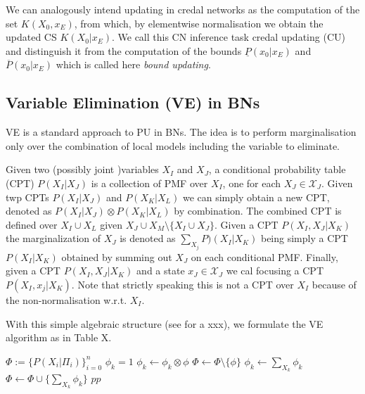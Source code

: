 We can analogously intend updating in credal networks as the computation of the set $K(X_0,x_E)$, from which, by elementwise normalisation we obtain the updated CS $K(X_0|x_E)$. We call this CN inference task credal updating (CU) and distinguish it from the computation of the bounds $\underline{P}(x_0|x_E)$ and $\overline{P}(x_0|x_E)$ which is called here \emph{bound updating}.

\subsection{Variable Elimination (VE) in BNs}

VE is a standard approach to PU in BNs. The idea is to perform marginalisation only over the combination of local models including the variable to eliminate.

Given two (possibly joint )variables $X_I$ and $X_J$, a conditional probability table (CPT) $P(X_I|X_J)$ is a collection of PMF over $X_I$, one for each $X_J\in\mathcal{X}_J$. Given twp CPTs $P(X_I|X_J)$ and $P(X_K|X_L)$ we can simply obtain a new CPT, denoted as $P(X_I|X_J)\otimes P(X_K|X_L)$ by combination. The combined CPT is defined over $X_I \cup X_L$ given $X_J \cup X_M \setminus \{ X_I \cup X_J\}$. Given a CPT $P(X_I,X_J|X_K)$
the marginalization of $X_J$ is denoted as $\sum_{X_j} P)(X_I|X_K)$ being simply a CPT $P(X_I|X_K)$ obtained by summing out $X_J$ on each conditional PMF. Finally, given a CPT $P(X_I,X_J|X_K)$ and a state $x_J\in\mathcal{X}_J$ we cal focusing a CPT $P(X_I,x_j|X_K)$. Note that strictly speaking this is not a CPT over $X_I$ because of the non-normalisation w.r.t. $X_I$.

With this simple algebraic structure (see \cite{kohlas2003} for a xxx), we formulate the VE algorithm as in Table X.


\begin{algorithm}
	\caption{VE algorithm
		\vskip 0.6mm [INPUT] a BN specification, an evidence $(x_{n-n_e},\ldots,x_n)$%
		\vskip 0.6mm [OUTPUT] $K(X_o|x_{n-n_e},\ldots,x_n)$} %
	\begin{algorithmic}[1]
		\State $\Phi := \{ P(X_i|\Pi_i) \}_{i=0}^n$ 
		\State $\phi_k =1$ %
		\For{$\phi \in \Phi$}
		\State $\phi_k \gets \phi_k \otimes \phi$
		\State $\Phi \gets \Phi \setminus \{ \phi \}$
		\EndIf
		\EndFor
		\EndFor
		\State $\phi_k \gets \sum_{X_k} \phi_k $
		\EndIf
		\State $\Phi \gets \Phi \cup \{ \sum_{X_k} \phi_k \}$
		 $pp$ 
	\end{algorithmic}
\end{algorithm}





